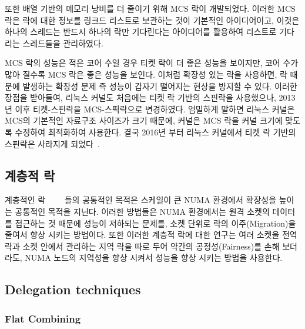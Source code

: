 또한 배열 기반의 메모리 낭비를 더 줄이기 위해 MCS 락이 개발되었다. 
이러한 MCS 락은 락에 대한 정보를 링크드 리스트로 보관하는 것이 기본적인 아이디어이고, 
이것은 하나의 스레드는 반드시 하나의 락만 기다린다는 아이디어를 활용하여 리스트로 기다리는 
스레드들을 관리하였다. 
 
MCS 락의 성능은 적은 코어 수일 경우 티켓 락이 더 좋은 성능을 보이지만, 
코어 수가 많아 질수록 MCS 락은 좋은 성능을 보인다. 
이처럼 확장성 있는 락을 사용하면, 락 때문에 발생하는 확장성 문제 즉 성능이 갑자기 떨어지는 현상을 
방지할 수 있다.
이러한 장점을 받아들여, 리눅스 커널도 처음에는 티켓 락 기반의 스핀락을 사용했으나, 
2013년 이후 티켓-스핀락을 MCS-스픽락으로 변경하였다. 
엄밀하게 말하면 리눅스 커널은 MCS의 기본적인 자료구조 사이즈가 크기 때문에, 커널은 MCS 락을 커널 크기에 
맞도록 수정하여 최적화하여 사용한다. 
결국 2016년 부터 리눅스 커널에서 티켓 락 기반의 스핀락은 사라지게 되었다~\cite{ticket}.
 
\subsection{계층적 락}

계층적인 락~\cite{Radovic2003HBL}~\cite{Chabbi2016CLL}~\cite{Luchangco2006HCQ}
~\cite{Chabbi2015HPL}들의 공통적인 목적은 스케일이 큰 NUMA 환경에서 확장성을 높이는 공통적인 목적을 지닌다. 
이러한 방법들은 NUMA 환경에서는 원격 소켓의 데이터를 접근하는 것 때문에 성능이 저하되는 문제를,
소켓 단위로 락의 이주(Migration)을 줄여서 향상 시키는 방법이다.
또한 이러한 계층적 락에 대한 연구는 여러 소켓을 전역 락과 소켓 안에서 관리하는
지역 락을 따로 두어 약간의 공정성(Fairness)를 손해 보더라도, 
NUMA 노드의 지역성을 향상 시켜서 성능을 향상 시키는 방법을 사용한다.

\subsection{Delegation techniques}

\subsubsection{Flat Combining}

